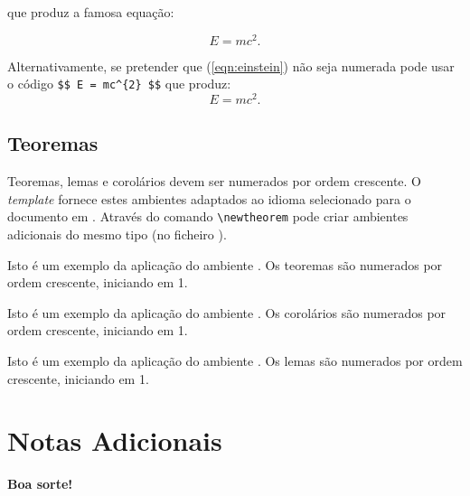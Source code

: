 \noindent que produz a famosa equação:

\begin{equation}
E = mc^{2} .
\label{eqn:einstein}
\end{equation}

Alternativamente, se pretender que (\ref{eqn:einstein}) não seja numerada pode usar o código \verb|$$ E = mc^{2} $$| que produz:
$$ E = mc^{2} .$$


\subsection{Teoremas}

Teoremas, lemas e corolários devem ser numerados por ordem crescente. O \textit{template} fornece estes ambientes adaptados ao idioma selecionado para o documento em . Através do comando \verb|\newtheorem| pode criar ambientes adicionais do mesmo tipo (no ficheiro ). 

\begin{theorem}
Isto é um exemplo da aplicação do ambiente . Os teoremas são numerados por ordem crescente, iniciando em 1.
\end{theorem}

\begin{corollary}
Isto é um exemplo da aplicação do ambiente . Os corolários são numerados por ordem crescente, iniciando em 1.
\end{corollary}

\begin{lemma}
Isto é um exemplo da aplicação do ambiente . Os lemas são numerados por ordem crescente, iniciando em 1.
\end{lemma}

\clearpage
\section{Notas Adicionais}

\textbf{Boa sorte!}

